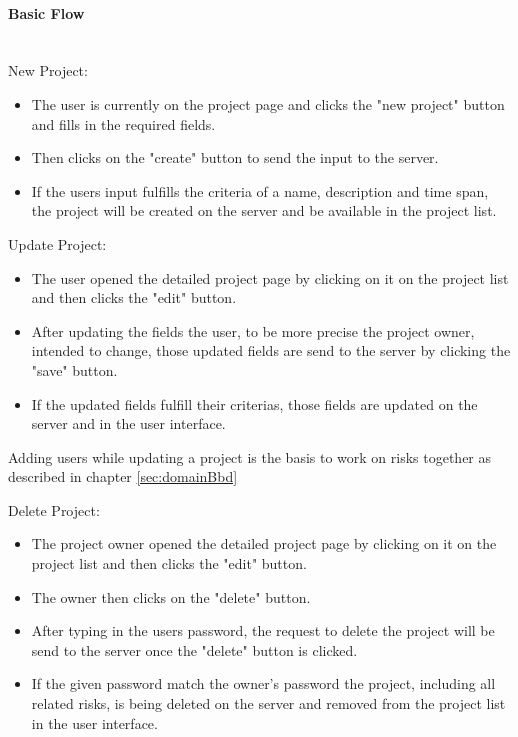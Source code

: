 \newpage
\paragraph*{Basic Flow} \mbox{}\\
\noindent
New Project:
\begin{itemize}
	\vspace{-3mm}
	\setlength\itemsep{-1em}
	
	\item The user is currently on the project page and clicks the "new project" button and fills in the required fields.
	\item Then clicks on the "create" button to send the input to the server.
	\item If the users input fulfills the criteria of a name, description and time span, the project will be created on the server and be available in the project list.
\end{itemize}

\noindent
Update Project: 
\begin{itemize}
	\vspace{-3mm}
	\setlength\itemsep{-1em}
	\item The user opened the detailed project page by clicking on it on the project list and then clicks the "edit" button.
	\item After updating the fields the user, to be more precise the project owner, intended to change, those updated fields are send to the server by clicking the "save" button.
	\item If the updated fields fulfill their criterias, those fields are updated on the server and in the user interface.
\end{itemize} 
Adding users while updating a project is the basis to work on risks together as described in chapter \ref{sec:domainBbd}

\noindent
Delete Project:
\begin{itemize}
	\vspace{-3mm}
	\setlength\itemsep{-1em}
	\item The project owner opened the detailed project page by clicking on it on the project list and then clicks the "edit" button.
	\item The owner then clicks on the "delete" button. 
	\item After typing in the users password, the request to delete the project will be send to the server once the "delete" button is clicked.
	\item If the given password match the owner's password the project, including all related risks, is being deleted on the server and removed from the project list in the user interface.
\end{itemize}

